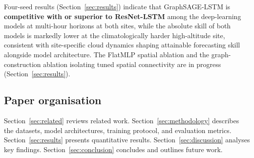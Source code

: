 Four-seed results (Section~\ref{sec:results}) indicate that GraphSAGE-LSTM is
\textbf{competitive with or superior to ResNet-LSTM} among the deep-learning
models at multi-hour horizons at both sites, while the absolute skill of both
models is markedly lower at the climatologically harder high-altitude site,
consistent with site-specific cloud dynamics shaping attainable forecasting
skill alongside model architecture. The FlatMLP spatial ablation and the
graph-construction ablation isolating tuned spatial connectivity are in
progress (Section~\ref{sec:results}).

\subsection*{Paper organisation}

Section~\ref{sec:related} reviews related work. Section~\ref{sec:methodology}
describes the datasets, model architectures, training protocol, and evaluation
metrics. Section~\ref{sec:results} presents quantitative results.
Section~\ref{sec:discussion} analyses key findings. Section~\ref{sec:conclusion}
concludes and outlines future work.
